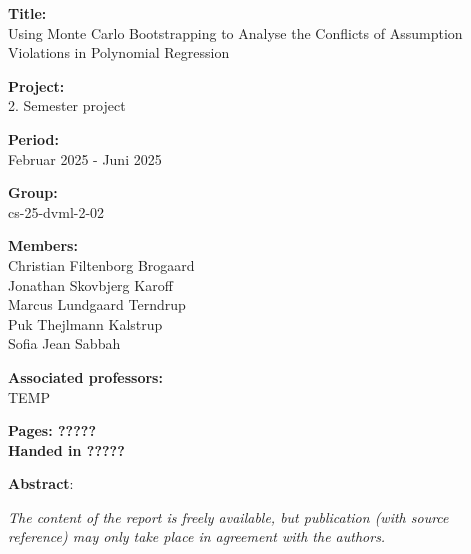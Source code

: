 \begin{minipage}[t]{0.48\textwidth}
\textbf{Title:} \\[5pt]\hspace*{2ex}
\noindent Using Monte Carlo Bootstrapping to Analyse the Conflicts of Assumption Violations in Polynomial Regression

\vspace*{2ex}

\textbf{Project:} \\[5pt]\bigskip\hspace{2ex}
2. Semester project

\textbf{Period:} \\[5pt]\bigskip\hspace{2ex}
Februar 2025 -  Juni 2025

\textbf{Group:} \\[5pt]\bigskip\hspace{2ex}
cs-25-dvml-2-02

\textbf{Members:} \\[5pt]\hspace*{2ex}
Christian Filtenborg Brogaard \\\hspace*{2ex}
Jonathan Skovbjerg Karoff \\\hspace*{2ex}
Marcus Lundgaard Terndrup \\\hspace*{2ex}
Puk Thejlmann Kalstrup \\\hspace*{2ex}
Sofia Jean Sabbah \\\hspace*{2ex}


\textbf{Associated professors:} \\[5pt]\hspace*{2ex}
TEMP
\\\hspace*{2ex}

\vspace*{1cm}

\textbf{Pages: ?????} \\
\textbf{Handed in ?????}

\end{minipage}
\hfill
\begin{minipage}[t]{0.5\textwidth}
\textbf{Abstract}: \\[5pt]
\fbox{\parbox{8cm}{}}
\end{minipage}

\vfill

{\footnotesize\itshape \noindent The content of the report is freely available, but publication (with source reference) may only take place in agreement with the authors.}

